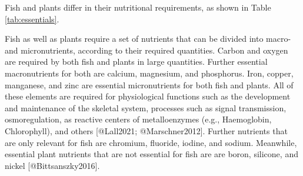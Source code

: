 Fish and plants differ in their nutritional requirements, as shown in Table \ref{tab:essentials}.

Fish as well as plants require a set of nutrients that can be divided into macro- and micronutrients, according to their required quantities. Carbon and oxygen are required by both fish and plants in large quantities. Further essential macronutrients for both are calcium, magnesium, and phosphorus. Iron, copper, manganese, and zinc are essential micronutrients for both fish and plants. All of these elements are required for physiological functions such as the development and maintenance of the skeletal system, processes such as signal transmission, osmoregulation, as reactive centers of metalloenzymes (e.g., Haemoglobin, Chlorophyll), and others [@Lall2021; @Marschner2012]. Further nutrients that are only relevant for fish are chromium, fluoride, iodine, and sodium. Meanwhile, essential plant nutrients that are not essential for fish are are boron, silicone, and nickel [@Bittsanszky2016].